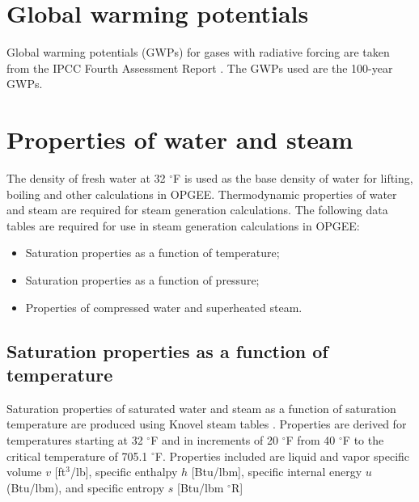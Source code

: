 \documentclass[11pt]{report}
\newcommand{\marg}[1]{{\footnotesize\textit{\textcolor{stanford}{'#1'}}}}
\newcommand{\marginnote}[1]{\marginpar{\marg{#1}}}
\begin{document}
{{{{%
\section{Global warming potentials} \label{sec:GWPs}

Global \marginnote{Input \\ Data \\ Table 2.1} warming potentials (GWPs) for gases with radiative forcing are taken from the IPCC Fourth Assessment Report \cite{IPCC2007}. The GWPs used are the 100-year GWPs. 





\section{Properties of water and steam}
The density of fresh water at 32 $^\circ$F is used as the base density of water for lifting, boiling and other calculations in OPGEE. \marginnote{Input \\ Data \\ Table 5.1}
Thermodynamic properties of water and steam are required for steam generation calculations. The following data tables are required for use in steam generation calculations in OPGEE:
\begin{itemize}
\item Saturation properties as a function of temperature;
\item Saturation properties as a function of pressure;
\item Properties of compressed water and superheated steam.
\end{itemize}

\subsection{Saturation properties as a function of temperature}
Saturation \marginnote{Input \\ Data \\ Table 5.2} properties of saturated water and steam as a function of saturation temperature are produced using Knovel steam tables \cite[Table 1b]{Knovel2006}. Properties are derived for temperatures starting at 32 $^\circ$F and in increments of 20 $^\circ$F from 40 $^\circ$F to the critical temperature of 705.1 $^\circ$F. Properties included are liquid and vapor specific volume $v$ [ft$^3$/lb], specific enthalpy $h$ [Btu/lbm], specific internal energy $u$ (Btu/lbm), and specific entropy $s$ [Btu/lbm $^\circ$R]

}}}}
\end{document}
